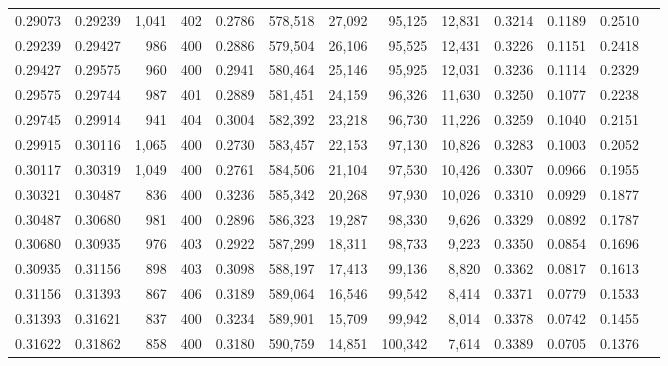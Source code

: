 \begin{tabular}{rrrrrrrrrrrrr}
0.29073 & 0.29239 &  1,041 & 402 &                                     0.2786 & 578,518 &  27,092 &  95,125 &  12,831 & 0.3214 & 0.1189 & 0.2510 \\
0.29239 & 0.29427 &    986 & 400 &                                     0.2886 & 579,504 &  26,106 &  95,525 &  12,431 & 0.3226 & 0.1151 & 0.2418 \\
0.29427 & 0.29575 &    960 & 400 &                                     0.2941 & 580,464 &  25,146 &  95,925 &  12,031 & 0.3236 & 0.1114 & 0.2329 \\
0.29575 & 0.29744 &    987 & 401 &                                     0.2889 & 581,451 &  24,159 &  96,326 &  11,630 & 0.3250 & 0.1077 & 0.2238 \\
0.29745 & 0.29914 &    941 & 404 &                                     0.3004 & 582,392 &  23,218 &  96,730 &  11,226 & 0.3259 & 0.1040 & 0.2151 \\
0.29915 & 0.30116 &  1,065 & 400 &                                     0.2730 & 583,457 &  22,153 &  97,130 &  10,826 & 0.3283 & 0.1003 & 0.2052 \\
0.30117 & 0.30319 &  1,049 & 400 &                                     0.2761 & 584,506 &  21,104 &  97,530 &  10,426 & 0.3307 & 0.0966 & 0.1955 \\
0.30321 & 0.30487 &    836 & 400 &                                     0.3236 & 585,342 &  20,268 &  97,930 &  10,026 & 0.3310 & 0.0929 & 0.1877 \\
0.30487 & 0.30680 &    981 & 400 &                                     0.2896 & 586,323 &  19,287 &  98,330 &   9,626 & 0.3329 & 0.0892 & 0.1787 \\
0.30680 & 0.30935 &    976 & 403 &                                     0.2922 & 587,299 &  18,311 &  98,733 &   9,223 & 0.3350 & 0.0854 & 0.1696 \\
0.30935 & 0.31156 &    898 & 403 &                                     0.3098 & 588,197 &  17,413 &  99,136 &   8,820 & 0.3362 & 0.0817 & 0.1613 \\
0.31156 & 0.31393 &    867 & 406 &                                     0.3189 & 589,064 &  16,546 &  99,542 &   8,414 & 0.3371 & 0.0779 & 0.1533 \\
0.31393 & 0.31621 &    837 & 400 &                                     0.3234 & 589,901 &  15,709 &  99,942 &   8,014 & 0.3378 & 0.0742 & 0.1455 \\
0.31622 & 0.31862 &    858 & 400 &                                     0.3180 & 590,759 &  14,851 & 100,342 &   7,614 & 0.3389 & 0.0705 & 0.1376 \\

\end{tabular}
